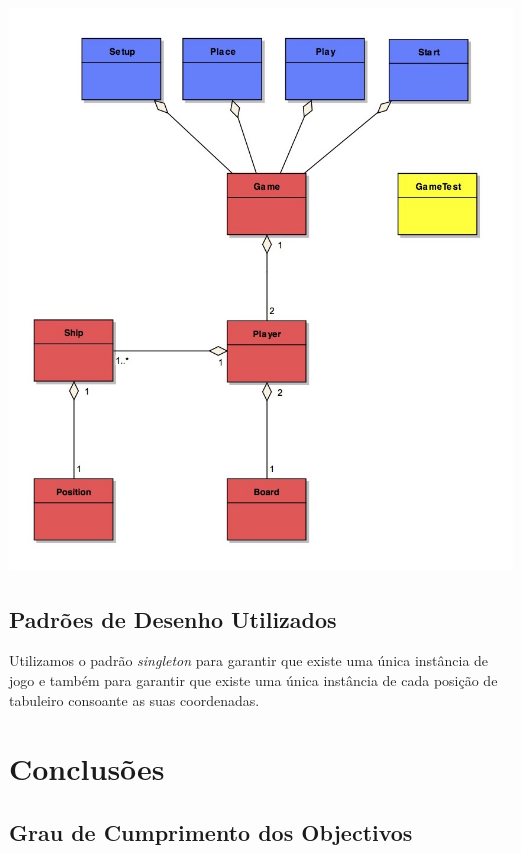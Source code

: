 \documentclass[12pt,a4paper,reqno]{report}
\numberwithin{equation}{section}
\begin{document}
\begin{center}

\includegraphics[width=16cm]{class.jpg}

\end{center}

\section{Padrões de Desenho Utilizados}

	Utilizamos o padrão \emph{singleton} para garantir que existe uma única instância de jogo e também para garantir que existe uma única instância de cada posição de tabuleiro consoante as suas coordenadas.

\chapter{Conclusões}

\section{Grau de Cumprimento dos Objectivos}
	
\end{document}

